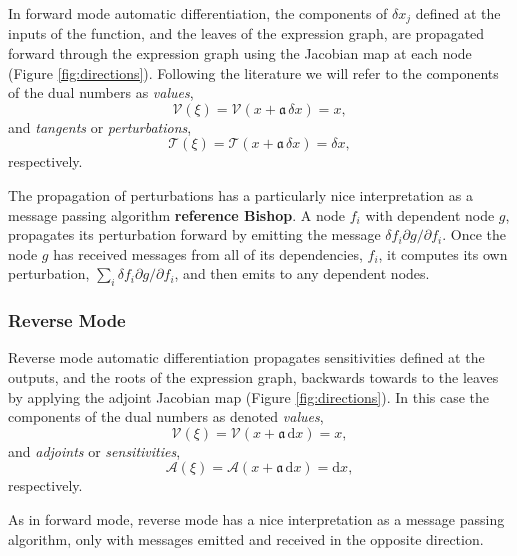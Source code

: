 In forward mode automatic differentiation, the components of $\delta x_{j}$ defined at 
the inputs of the function, and the leaves of the expression graph, are propagated forward 
through the expression graph using the Jacobian map at each node (Figure \ref{fig:directions}).  
Following the literature we will refer to the components of the dual numbers as \textit{values},
%
\begin{equation*}
\mathcal{V} \! \left( \xi \right) 
= \mathcal{V} \! \left( x + \mathfrak{a} \, \delta x \right) 
= x,
\end{equation*}
%
and \textit{tangents} or \textit{perturbations},
\begin{equation*}
\mathcal{T} \! \left( \xi \right) 
= \mathcal{T} \! \left( x + \mathfrak{a} \, \delta x \right) 
= \delta x,
\end{equation*}
%
respectively.

The propagation of perturbations has a particularly nice interpretation as a 
message passing algorithm \textbf{reference Bishop}.  A node $f_{i}$ with dependent
node $g$, propagates its perturbation forward by emitting the message 
$ \delta f_{i} \partial g / \partial f_{i}$.  Once the node $g$ has received messages from
all of its dependencies, $f_{i}$, it computes its own perturbation, 
$\sum_{i} \delta f_{i} \partial g / \partial f_{i}$, and then emits to any dependent nodes.

\subsubsection{Reverse Mode}

Reverse mode automatic differentiation propagates sensitivities defined at the outputs,
and the roots of the expression graph, backwards towards to the leaves by applying
the adjoint Jacobian map (Figure \ref{fig:directions}).  In this case the components of 
the dual numbers as denoted \textit{values},
%
\begin{equation*}
\mathcal{V} \! \left( \xi \right) 
= \mathcal{V} \! \left( x + \mathfrak{a} \, \mathrm{d} x \right) 
= x,
\end{equation*}
%
and \textit{adjoints} or \textit{sensitivities},
\begin{equation*}
\mathcal{A} \! \left( \xi \right) 
= \mathcal{A} \! \left( x + \mathfrak{a} \, \mathrm{d} x \right) 
= \mathrm{d} x,
\end{equation*}
%
respectively.

As in forward mode, reverse mode has a nice interpretation as a message passing
algorithm, only with messages emitted and received in the opposite direction.


